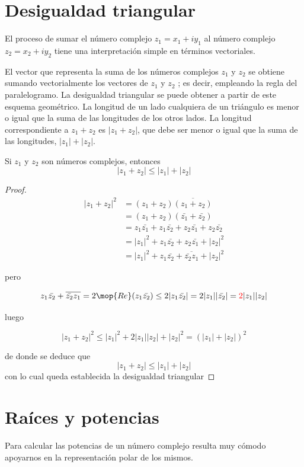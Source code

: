\documentclass{apuntes}
\begin{document}
\section{Desigualdad triangular}
El proceso de sumar el número complejo $z_1 = x_1 + iy_1$ al número complejo $z_2 = x_2 + iy_2$ tiene una interpretación simple en términos vectoriales.

El vector que representa la suma de los números complejos $z_1$ y $z_2$ se obtiene sumando vectorialmente los vectores de $z_1$ y $z_2$ ; es decir, empleando la regla del paralelogramo. La desigualdad triangular se puede obtener a partir de este esquema
geométrico. La longitud de un lado cualquiera de un triángulo es menor o igual que la suma de las longitudes de los otros lados. La longitud correspondiente a $z_1 + z_2$ es $|z_1 + z_2 |$, que debe ser menor o igual que la suma de las longitudes, $|z_1 | + |z_2 |$.

\begin{prop}
Si $z_1$ y $z_2$ son números complejos, entonces
\[|z_1+z_2|\leq |z_1|+|z_2|\]
\end{prop}
\begin{proof}
\begin{align*}
|z_1+z_2|^2 & = (z_1+z_2)\overline{(z_1+z_2)} \\
& = (z_1+z_2)(\bar{z_1}+\bar{z_2}) \\
& = z_1\bar{z_1}+z_1\bar{z_2}+z_2\bar{z_1}+z_2\bar{z_2} \\
& = |z_1|^2+z_1\bar{z_2}+z_2\bar{z_1}+|z_2|^2 \\
& = |z_1|^2+z_1\bar{z_2}+\overline{\bar{z_2}z_1}+|z_2|^2
\end{align*}

pero

\[z_1\bar{z_2}+\overline{\bar{z_2}z_1} = 2 \mop{Re}(z_1\bar{z_2}) \leq 2|z_1\bar{z_2}| = 2 |z_1||\bar{z_2}| = \textcolor{red}{2}|z_1||z_2|\]

luego

\[|z_1+z_2|^2 \leq |z_1|^2+2|z_1||z_2|+|z_2|^2 = (|z_1|+|z_2|)^2\]

de donde se deduce que
\[|z_1+z_2| \leq |z_1|+|z_2|\]
con lo cual queda establecida la desigualdad triangular
\end{proof}

\section{Raíces y potencias}
Para calcular las potencias de un número complejo resulta muy cómodo apoyarnos en la representación polar de los mismos.
\end{document}
